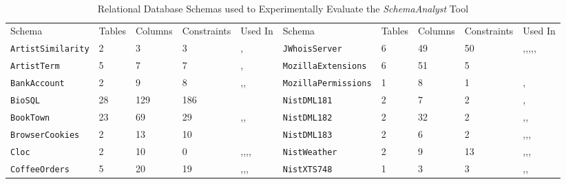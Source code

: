 \begin{table*}[t]
  \scriptsize
  \centering
  \vspace*{-.2in}
  \caption{Relational Database Schemas used to Experimentally Evaluate the \textit{SchemaAnalyst} Tool}~\label{tab:schemas}
  \begin{tabular}{llllllllll}
    Schema&Tables&Columns&Constraints&Used In&Schema&Tables&Columns&Constraints&Used In \\
    {\tt ArtistSimilarity}&2&3&3&\cite{mcminn2015effectiveness},\cite{wright2014impact} &
    {\tt JWhoisServer}&6&49&50&\cite{kapfhammer2013search},\cite{mcminn2015effectiveness},\cite{kinneer2015automatically},\cite{wright2013efficient},\cite{wright2014impact},\cite{mcminn2016virtual}\\
    {\tt ArtistTerm}&5&7&7&\cite{mcminn2015effectiveness},\cite{wright2014impact} &
    {\tt MozillaExtensions}&6&51&5&\cite{mcminn2015effectiveness} \\
    {\tt BankAccount} &2&9&8&\cite{kapfhammer2013search},\cite{mcminn2015effectiveness},\cite{wright2014impact} &
    {\tt MozillaPermissions} &1&8&1&\cite{mcminn2015effectiveness},\cite{mcminn2016virtual} \\
    {\tt BioSQL} &28&129&186&\cite{kinneer2015automatically} &
    {\tt NistDML181} &2&7&2&\cite{kapfhammer2013search},\cite{mcminn2015effectiveness} \\
    {\tt BookTown} &23&69&29&\cite{kapfhammer2013search},\cite{mcminn2015effectiveness},\cite{wright2014impact} &
    {\tt NistDML182} &2&32&2&\cite{kapfhammer2013search},\cite{mcminn2015effectiveness},\cite{wright2013efficient}\\
    {\tt BrowserCookies} &2&13&10&\cite{mcminn2015effectiveness} &
    {\tt NistDML183} &2&6&2&\cite{kapfhammer2013search},\cite{mcminn2015effectiveness},\cite{wright2013efficient},\cite{wright2014impact} \\
    {\tt Cloc} &2&10&0&\cite{kapfhammer2013search},\cite{mcminn2015effectiveness},\cite{kinneer2015automatically},\cite{wright2013efficient},\cite{wright2014impact}&
    {\tt NistWeather} &2&9&13&\cite{kapfhammer2013search},\cite{mcminn2015effectiveness},\cite{kinneer2015automatically},\cite{mcminn2016virtual}\\
    {\tt CoffeeOrders} &5&20&19&\cite{kapfhammer2013search},\cite{mcminn2015effectiveness},\cite{wright2014impact},\cite{mcminn2016virtual}&
    {\tt NistXTS748} &1&3&3&\cite{kapfhammer2013search},\cite{mcminn2015effectiveness},\cite{kinneer2015automatically} \\

\end{tabular}
\end{table*}

